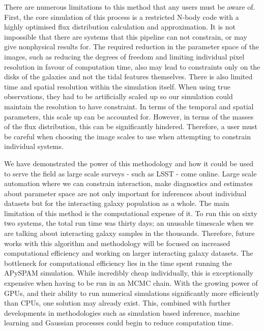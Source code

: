 There are numerous limitations to this method that any users must be aware of. First, the core simulation of this process is a restricted N-body code with a highly optimised flux distribution calculation and approximation. It is not impossible that there are systems that this pipeline can not constrain, or may give nonphysical results for. The required reduction in the parameter space of the images, such as reducing the degrees of freedom and limiting individual pixel resolution in favour of computation time, also may lead to constraints only on the disks of the galaxies and not the tidal features themselves. There is also limited time and spatial resolution within the simulation itself. When using true observations, they had to be artificially scaled up so our simulation could maintain the resolution to have constraint. In terms of the temporal and spatial parameters, this scale up can be accounted for. However, in terms of the masses of the flux distribution, this can be significantly hindered. Therefore, a user must be careful when choosing the image scales to use when attempting to constrain individual systems. 

We have demonstrated the power of this methodology and how it could be used to serve the field as large scale surveys - such as LSST - come online. Large scale automation where we can constrain interaction, make diagnostics and estimates about parameter space are not only important for inferences about individual datasets but for the interacting galaxy population as a whole. The main limitation of this method is the computational expense of it. To run this on sixty two systems, the total run time was thirty days; an unusable timescale when we are talking about interacting galaxy samples in the thousands. Therefore, future works with this algorithm and methodology will be focused on increased computational efficiency and working on larger interacting galaxy datasets. The bottleneck for computational efficiency lies in the time spent running the APySPAM simulation. While incredibly cheap individually, this is exceptionally expensive when having to be run in an MCMC chain. With the growing power of GPUs, and their ability to run numerical simulations significantly more efficiently than CPUs, one solution may already exist. This, combined with further developments in methodologies such as simulation based inference, machine learning and Gaussian processes could begin to reduce computation time.


% 
% 